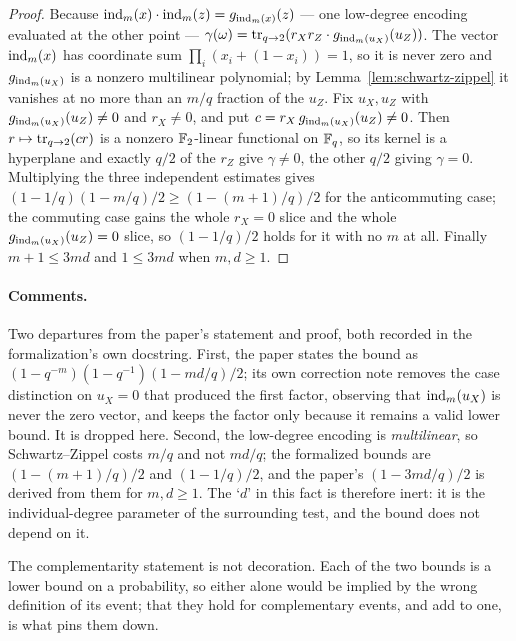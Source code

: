 \begin{proof}
\leanok
{}
Because $\mathrm{ind}_m(x) \cdot \mathrm{ind}_m(z) = g_{\mathrm{ind}_m(x)}(z)$ --- one low-degree encoding evaluated at
the other point --- $\gamma(\omega) = \operatorname{tr}_{q \to 2}(r_X r_Z \cdot g_{\mathrm{ind}_m(u_X)}(u_Z))$.
The vector $\mathrm{ind}_m(x)$ has coordinate sum $\prod_i (x_i + (1 - x_i)) = 1$, so it is never zero
and $g_{\mathrm{ind}_m(u_X)}$ is a nonzero multilinear polynomial; by
Lemma~\ref{lem:schwartz-zippel} it vanishes at no more than an $m/q$ fraction of the $u_Z$.
Fix $u_X, u_Z$ with $g_{\mathrm{ind}_m(u_X)}(u_Z) \neq 0$ and $r_X \neq 0$, and put
$c = r_X\, g_{\mathrm{ind}_m(u_X)}(u_Z) \neq 0$. Then $r \mapsto \operatorname{tr}_{q \to 2}(c r)$ is a nonzero
$\mathbb{F}_2$-linear functional on $\mathbb{F}_q$, so its kernel is a hyperplane and exactly $q/2$ of the
$r_Z$ give $\gamma \neq 0$, the other $q/2$ giving $\gamma = 0$. Multiplying the three
independent estimates gives $(1 - 1/q)(1 - m/q)/2 \geq (1 - (m+1)/q)/2$ for the anticommuting
case; the commuting case gains the whole $r_X = 0$ slice and the whole $g_{\mathrm{ind}_m(u_X)}(u_Z) =
0$ slice, so $(1 - 1/q)/2$ holds for it with no $m$ at all. Finally $m + 1 \leq 3md$ and
$1 \leq 3md$ when $m, d \geq 1$.
\end{proof}

\paragraph{Comments.} Two departures from the paper's statement and proof, both recorded in
the formalization's own docstring. First, the paper states the bound as
$(1 - q^{-m})(1 - q^{-1})(1 - md/q)/2$; its own correction note removes the case distinction on
$u_X = 0$ that produced the first factor, observing that $\mathrm{ind}_m(u_X)$ is never the zero
vector, and keeps the factor only because it remains a valid lower bound. It is dropped here.
Second, the low-degree encoding is \emph{multilinear}, so Schwartz--Zippel costs $m/q$ and not
$md/q$; the formalized bounds are $(1 - (m+1)/q)/2$ and $(1 - 1/q)/2$, and the paper's
$(1 - 3md/q)/2$ is derived from them for $m, d \geq 1$. The `$d$' in this fact is therefore
inert: it is the individual-degree parameter of the surrounding test, and the bound does not
depend on it.

The complementarity statement is not decoration. Each of the two bounds is a lower bound on a
probability, so either alone would be implied by the wrong definition of its event; that they
hold for complementary events, and add to one, is what pins them down.

